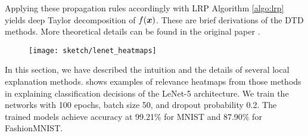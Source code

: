 Applying these propagation rules accordingly with LRP Algorithm \ref{algo:lrp} yields deep Taylor decomposition of  $f(\boldsymbol{x})$. These are brief derivations of the DTD methods. More theoretical details can be found in the original paper \citep{MontavonExplainingnonlinearclassification2017}.





\begin{figure}[!htb]
\centering
\texttt{[image: sketch/lenet\_heatmaps]}
\label{fig:lenet_heatmaps}
\end{figure}

In this section, we have described the intuition and the details of several local explanation methods. \addfigure{\ref{fig:lenet_heatmaps}} shows  examples of relevance heatmaps from those methods in explaining classification decisions of the LeNet-5 \citep{LeCunGradientBasedLearningApplied2001} architecture. We train the networks with 100 epochs, batch size 50, and dropout probability 0.2. The trained models achieve accuracy at 99.21\% for MNIST and 87.90\% for FashionMNIST. 

